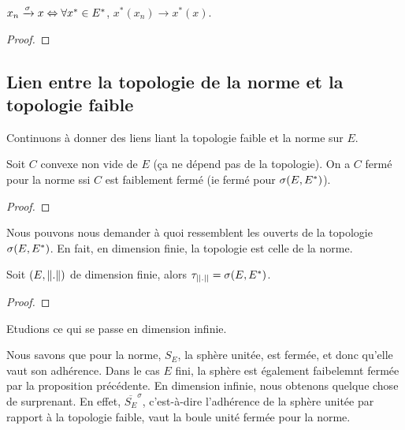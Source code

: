 \begin{proposition}
	$x_{n} \xrightarrow{\sigma} x \Leftrightarrow \forall x^{*} \in E^{*}$,
	$x^{*}(x_{n}) \rightarrow x^{*}(x)$.
\end{proposition}

\ifdefined\outputproof
\begin{proof}

\end{proof}
\fi

\subsection{Lien entre la topologie de la norme et la topologie faible}

Continuons à donner des liens liant la topologie faible et la norme sur $E$.

\begin{proposition}
	Soit $C$ convexe non vide de $E$ (ça ne dépend pas de la topologie).
	On a $C$ fermé pour la norme ssi $C$ est faiblement fermé (ie fermé pour
	$\sigma(E, E^{*})$).
\end{proposition}

\ifdefined\outputproof
\begin{proof}

\end{proof}
\fi

Nous pouvons nous demander à quoi ressemblent les ouverts de la topologie
$\sigma(E, E^{*})$. En fait, en dimension finie, la topologie est celle de la norme.

\begin{proposition}
	Soit $(E, \norm{.})$ de dimension finie, alors $\tau_{||.||}
	= \sigma(E, E^{*})$.
\end{proposition}

\ifdefined\outputproof
\begin{proof}

\end{proof}
\fi

Etudions ce qui se passe en dimension infinie.

Nous savons que pour la norme, $S_{E}$, la sphère unitée, est fermée, et donc
qu'elle vaut son adhérence.  Dans le cas $E$ fini, la sphère est également
faibelemnt fermée par la proposition précédente. En dimension infinie, nous
obtenons quelque chose de surprenant. En effet, $\overline{S_{E}}^{\sigma}$,
c'est-à-dire l'adhérence de la sphère unitée par rapport à la topologie faible,
vaut la boule unité fermée pour la norme.


